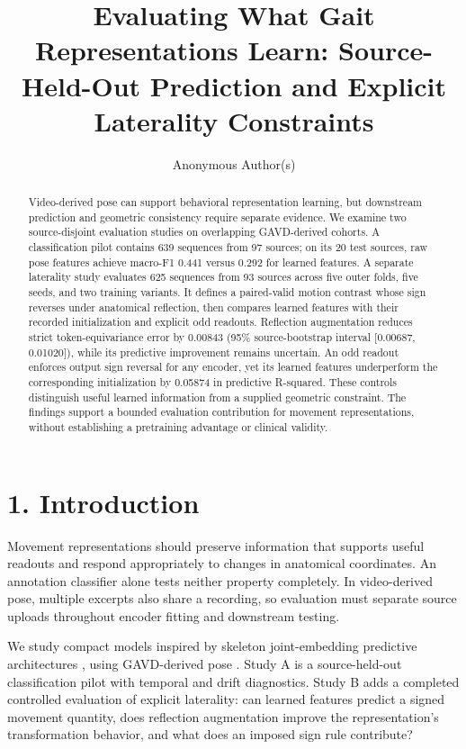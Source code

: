 \documentclass{article}
\title{Evaluating What Gait Representations Learn: Source-Held-Out
Prediction and Explicit Laterality Constraints}
\author{Anonymous Author(s)}
\begin{document}
\maketitle
\begin{abstract}
Video-derived pose can support behavioral representation learning, but
downstream prediction and geometric consistency require separate
evidence. We examine two source-disjoint evaluation studies on
overlapping GAVD-derived cohorts. A classification pilot contains 639
sequences from 97 sources; on its 20 test sources, raw pose features
achieve macro-F1 0.441 versus 0.292 for learned features. A separate
laterality study evaluates 625 sequences from 93 sources across five
outer folds, five seeds, and two training variants. It defines a
paired-valid motion contrast whose sign reverses under anatomical
reflection, then compares learned features with their recorded
initialization and explicit odd readouts. Reflection augmentation
reduces strict token-equivariance error by 0.00843 (95\%
source-bootstrap interval {[}0.00687, 0.01020{]}), while its predictive
improvement remains uncertain. An odd readout enforces output sign
reversal for any encoder, yet its learned features underperform the
corresponding initialization by 0.05874 in predictive R-squared. These
controls distinguish useful learned information from a supplied
geometric constraint. The findings support a bounded evaluation
contribution for movement representations, without establishing a
pretraining advantage or clinical validity.
\end{abstract}
\section{1. Introduction}\label{introduction}

Movement representations should preserve information that supports
useful readouts and respond appropriately to changes in anatomical
coordinates. An annotation classifier alone tests neither property
completely. In video-derived pose, multiple excerpts also share a
recording, so evaluation must separate source uploads throughout encoder
fitting and downstream testing.

We study compact models inspired by skeleton joint-embedding predictive
architectures \citep{abdelfattah2024sjepa}, using GAVD-derived pose
\citep{ranjan2025gavd}. Study A is a source-held-out classification
pilot with temporal and drift diagnostics. Study B adds a completed
controlled evaluation of explicit laterality: can learned features
predict a signed movement quantity, does reflection augmentation improve
the representation's transformation behavior, and what does an imposed
sign rule contribute?
\end{document}
